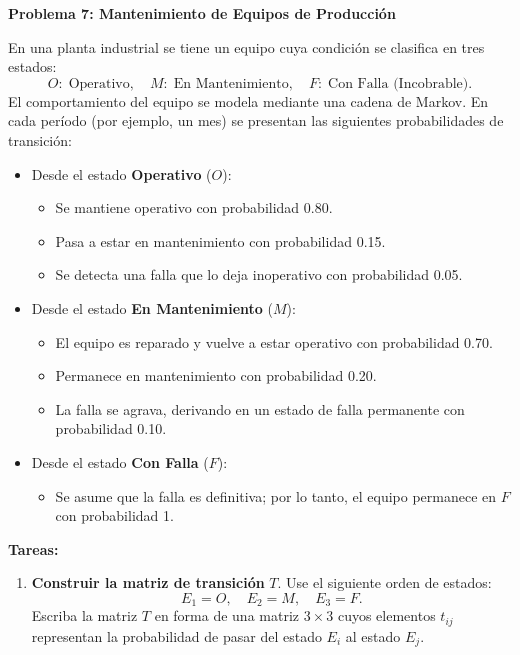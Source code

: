 \documentclass{article}
\begin{document}
\begin{problem}
\textbf{Problema 7: Mantenimiento de Equipos de Producción}

En una planta industrial se tiene un equipo cuya condición se clasifica en tres estados:
\[
O:\; \text{Operativo}, \quad M:\; \text{En Mantenimiento}, \quad F:\; \text{Con Falla (Incobrable)}.
\]
El comportamiento del equipo se modela mediante una cadena de Markov. En cada período (por ejemplo, un mes) se presentan las siguientes probabilidades de transición:

\begin{itemize}
    \item Desde el estado \textbf{Operativo} (\(O\)):
    \begin{itemize}
        \item Se mantiene operativo con probabilidad 0.80.
        \item Pasa a estar en mantenimiento con probabilidad 0.15.
        \item Se detecta una falla que lo deja inoperativo con probabilidad 0.05.
    \end{itemize}
    \item Desde el estado \textbf{En Mantenimiento} (\(M\)):
    \begin{itemize}
        \item El equipo es reparado y vuelve a estar operativo con probabilidad 0.70.
        \item Permanece en mantenimiento con probabilidad 0.20.
        \item La falla se agrava, derivando en un estado de falla permanente con probabilidad 0.10.
    \end{itemize}
    \item Desde el estado \textbf{Con Falla} (\(F\)):
    \begin{itemize}
        \item Se asume que la falla es definitiva; por lo tanto, el equipo permanece en \(F\) con probabilidad 1.
    \end{itemize}
\end{itemize}

\textbf{Tareas:}
\begin{enumerate}
    \item \textbf{Construir la matriz de transición} \(T\). Use el siguiente orden de estados:
    \[
    E_1 = O,\quad E_2 = M,\quad E_3 = F.
    \]
    Escriba la matriz \(T\) en forma de una matriz \(3 \times 3\) cuyos elementos \(t_{ij}\) representan la probabilidad de pasar del estado \(E_i\) al estado \(E_j\).
    

\end{enumerate}
\end{problem}
\end{document}
